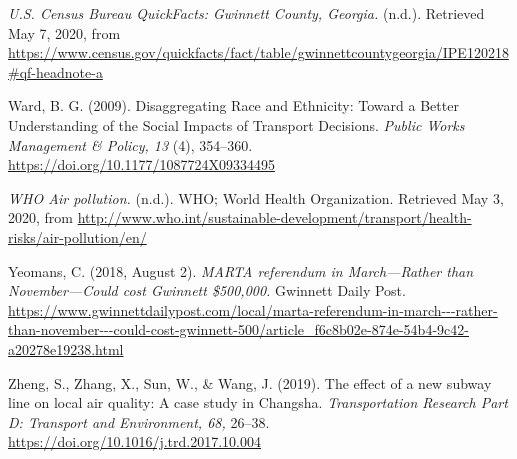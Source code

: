 \documentclass[
]{article}
\begin{document}
\emph{U.S. Census Bureau QuickFacts: Gwinnett County, Georgia. } (n.d.).
Retrieved May 7, 2020, from
\url{https://www.census.gov/quickfacts/fact/table/gwinnettcountygeorgia/IPE120218\#qf-headnote-a}

Ward, B. G. (2009). Disaggregating Race and Ethnicity: Toward a Better
Understanding of the Social Impacts of Transport Decisions. \emph{Public
Works Management \& Policy, 13} (4), 354--360.
\url{https://doi.org/10.1177/1087724X09334495}

\emph{WHO \textbar{} Air pollution. } (n.d.). WHO; World Health
Organization. Retrieved May 3, 2020, from
\url{http://www.who.int/sustainable-development/transport/health-risks/air-pollution/en/}

Yeomans, C. (2018, August 2). \emph{MARTA referendum in March---Rather
than November---Could cost Gwinnett \$500,000. } Gwinnett Daily Post.
\url{https://www.gwinnettdailypost.com/local/marta-referendum-in-march---rather-than-november---could-cost-gwinnett-500/article_f6c8b02e-874e-54b4-9c42-a20278e19238.html}

Zheng, S., Zhang, X., Sun, W., \& Wang, J. (2019). The effect of a new
subway line on local air quality: A case study in Changsha.
\emph{Transportation Research Part D: Transport and Environment, 68,
}26--38. \url{https://doi.org/10.1016/j.trd.2017.10.004}
\end{document}
